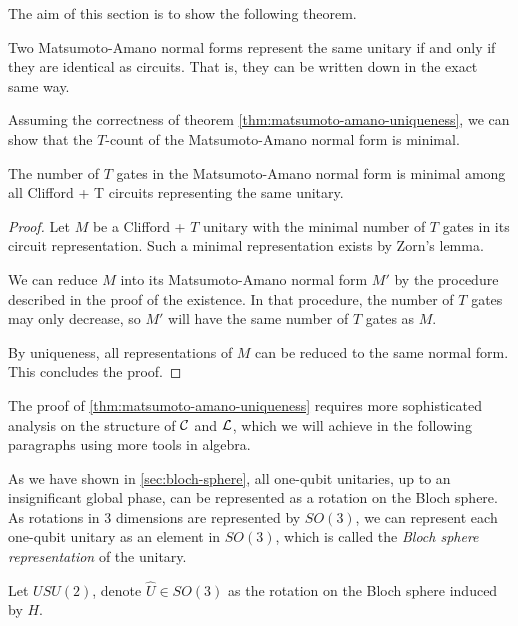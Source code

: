 The aim of this section is to show the following theorem.

\begin{theorem}\label{thm:matsumoto-amano-uniqueness}
	Two Matsumoto-Amano normal forms represent the same unitary if and only if they are identical as circuits. 
	That is, they can be written down in the exact same way.
\end{theorem}

Assuming the correctness of theorem \ref{thm:matsumoto-amano-uniqueness}, we can show that the $T$-count of the Matsumoto-Amano normal form is minimal.

\begin{corollary}
	The number of $T$ gates in the Matsumoto-Amano normal form is minimal among all Clifford + T circuits representing the same unitary.
\end{corollary}

\begin{proof}
	Let $M$ be a Clifford + $T$ unitary with the minimal number of $T$ gates in its circuit representation. 
	Such a minimal representation exists by Zorn's lemma.

	We can reduce $M$ into its Matsumoto-Amano normal form $M'$ by the procedure described in the proof of the existence. 
	In that procedure, the number of $T$ gates may only decrease, so $M'$ will have the same number of $T$ gates as $M$.

	By uniqueness, all representations of $M$ can be reduced to the same normal form.
	This concludes the proof.
\end{proof}

The proof of \autoref{thm:matsumoto-amano-uniqueness} requires more sophisticated analysis on the structure of $\mathcal{C}$ and $\mathcal{L}$, which we will achieve in the following paragraphs using more tools in algebra.

As we have shown in  \autoref{sec:bloch-sphere}, all one-qubit unitaries, up to an insignificant global phase, can be represented as a rotation on the Bloch sphere.
As rotations in 3 dimensions are represented by $SO(3)$, we can represent each one-qubit unitary as an element in $SO(3)$, which is called the \textit{Bloch sphere representation} of the unitary.

\begin{definition}
	Let $U SU(2)$, denote $\hat{U} \in SO(3)$ as the rotation on the Bloch sphere induced by $H$.
\end{definition}

